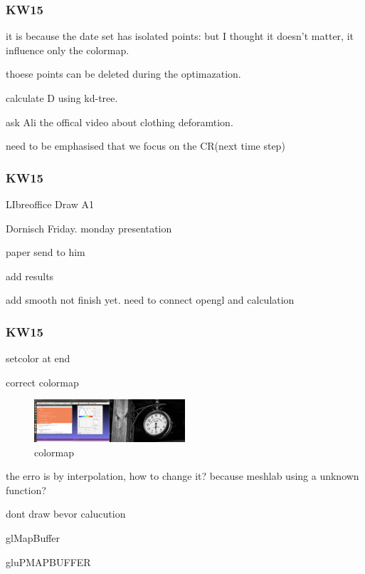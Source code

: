 \documentclass{beamer}
\begin{document}

\begin{frame}
\frametitle{KW15}
it is because the date set has isolated points: but I thought it doesn't matter, it influence only the colormap.

thoese points can be deleted during the optimazation.

calculate D using kd-tree.

ask Ali the offical video about clothing deforamtion.

need to be emphasised that we focus on the CR(next time step)
\end{frame}

\begin{frame}
\frametitle{KW15}
LIbreoffice Draw A1

Dornisch Friday. monday presentation

paper send to him

add results

add smooth not finish yet. need to connect opengl and calculation
\end{frame}

\begin{frame}
\frametitle{KW15}
setcolor at end

correct colormap 
\begin{figure}
\centering
\includegraphics[width=0.5\textwidth]{image//colormap_error.png}
\caption{colormap}
\end{figure}
the erro is by interpolation, how to change it? because meshlab using a unknown function?

dont draw bevor calucution

glMapBuffer

gluPMAPBUFFER
\end{frame}
\end{document}
